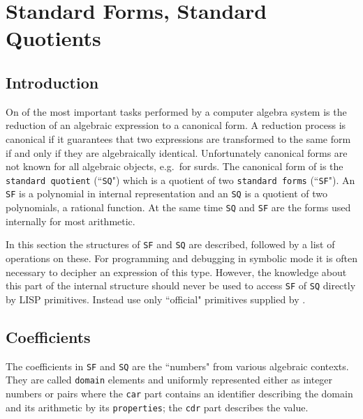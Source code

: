 \section{Standard Forms, Standard Quotients}

\subsection{Introduction}

On of the most important tasks performed by a computer algebra
system is the reduction of an algebraic expression to a 
canonical form. A reduction process is canonical if it
guarantees that two expressions are transformed to the
same form if and only if they are algebraically identical.
Unfortunately canonical forms are not known for all algebraic 
objects, e.g.\ for surds. The canonical form of {\reduce}
is the {\tt standard quotient} 
(``{\tt SQ}") which is
a quotient of two {\tt standard forms} (``{\tt SF}").
An {\tt SF} is a polynomial in internal representation and
an {\tt SQ} is a quotient of two polynomials, a 
rational function. At the same time {\tt SQ} and
{\tt SF} are the forms  used internally for most arithmetic.

In this section the structures of {\tt SF} and {\tt SQ}
are described, followed by a list of operations on these. For
programming and debugging in symbolic mode it is often
necessary to decipher an expression of this type.
However, the knowledge about this part of the internal
{\reduce} structure should never be used to access
{\tt SF} of {\tt SQ} directly by LISP primitives. Instead
use only ``official" primitives supplied by {\reduce}.

\subsection{Coefficients}

The coefficients in {\tt SF} and {\tt SQ} are the ``numbers"
from various algebraic contexts. They are called {\tt domain}
elements  and uniformly represented either
as integer numbers or pairs where the {\tt car} part contains
an identifier describing the domain and its arithmetic
by its {\tt properties};
the {\tt cdr} part describes the value.

